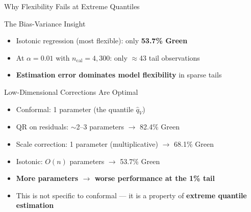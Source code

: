 \documentclass[9pt, aspectratio=169, t]{beamer}
\newcommand{\qV}{\hat{q}_V}
\begin{document}
\begin{frame}{Why Flexibility Fails at Extreme Quantiles}
	\vspace{-0.2cm}
	{\small
	\begin{alertblock}{The Bias-Variance Insight}
		\begin{itemize}\setlength{\itemsep}{4pt}
			\item Isotonic regression (most flexible): only \textbf{53.7\% Green}
			\item At $\alpha = 0.01$ with $n_{\mathrm{cal}} = 4{,}300$: only $\approx$43 tail observations
			\item \textbf{Estimation error dominates model flexibility} in sparse tails
		\end{itemize}
	\end{alertblock}
	\vspace{3mm}
	\begin{exampleblock}{Low-Dimensional Corrections Are Optimal}
		\begin{itemize}\setlength{\itemsep}{3pt}
			\item Conformal: 1 parameter (the quantile $\qV$)
			\item QR on residuals: $\sim$2--3 parameters $\to$ 82.4\% Green
			\item Scale correction: 1 parameter (multiplicative) $\to$ 68.1\% Green
			\item Isotonic: $O(n)$ parameters $\to$ 53.7\% Green
			\item \textbf{More parameters $\to$ worse performance at the 1\% tail}
			\item This is not specific to conformal --- it is a property of \textbf{extreme quantile estimation}
		\end{itemize}
	\end{exampleblock}
	}
\end{frame}
\end{document}
